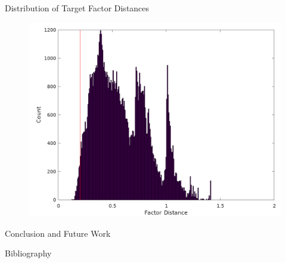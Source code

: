 \documentclass[handout]{beamer}
\begin{document}
\begin{frame}{Distribution of Target Factor Distances}
  \begin{figure}
    \centering
    \includegraphics[height=0.6\textheight]{diagrams/conference-target-distance}
  \end{figure}
\end{frame}


\begin{frame}{Conclusion and Future Work}

\end{frame}


\begin{frame}{Bibliography}

\end{frame}
\end{document}
